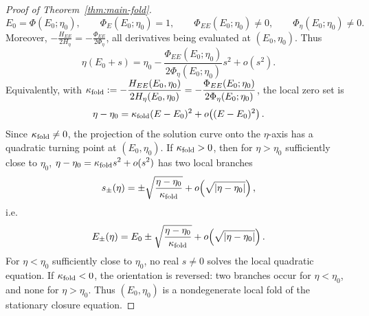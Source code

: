 \documentclass[pdflatex,sn-mathphys-num]{sn-jnl}
\theoremstyle{thmstyleone}
\theoremstyle{definition}
\theoremstyle{remark}
\newcommand{\abs}[1]{\left\lvert#1\right\rvert}
\numberwithin{equation}{section}
\begin{document}
\begin{proof}[Proof of Theorem~\ref{thm:main-fold}]
\[E_0=\Phi(E_0;\eta_0),
\qquad
\Phi_E(E_0;\eta_0)=1,
\qquad
\Phi_{EE}(E_0;\eta_0)\ne0,
\qquad
\Phi_\eta(E_0;\eta_0)\ne0.
\]
Moreover,
$\displaystyle 
-\frac{H_{EE}}{2H_\eta}
=
-\frac{\Phi_{EE}}{2\Phi_\eta}$,
all derivatives being evaluated at \((E_0,\eta_0)\). Thus
\[
\eta(E_0+s)
=
\eta_0
-
\frac{\Phi_{EE}(E_0;\eta_0)}
     {2\Phi_\eta(E_0;\eta_0)}
s^2
+
o(s^2).
\]
Equivalently, with
$\displaystyle 
\kappa_{\rm fold}
:=
-\frac{H_{EE}(E_0,\eta_0)}{2H_\eta(E_0,\eta_0)}
=
-\frac{\Phi_{EE}(E_0;\eta_0)}{2\Phi_\eta(E_0;\eta_0)}$,
the local zero set is
\[
\eta-\eta_0
=
\kappa_{\rm fold}(E-E_0)^2
+
o\!\left((E-E_0)^2\right).
\]
Since
$\displaystyle 
\kappa_{\rm fold}\ne0$,
the projection of the solution curve onto the \(\eta\)-axis has a quadratic
turning point at \((E_0,\eta_0)\).
If \(\kappa_{\rm fold}>0\), then for \(\eta>\eta_0\) sufficiently close to
\(\eta_0\),
$\displaystyle 
\eta-\eta_0
=
\kappa_{\rm fold}s^2+o(s^2)$
has two local branches
\[
s_\pm(\eta)
=
\pm
\sqrt{\frac{\eta-\eta_0}{\kappa_{\rm fold}}}
+
o\!\left(\sqrt{\abs{\eta-\eta_0}}\right),
\]
i.e.
\[
E_\pm(\eta)
=
E_0
\pm
\sqrt{\frac{\eta-\eta_0}{\kappa_{\rm fold}}}
+
o\!\left(\sqrt{\abs{\eta-\eta_0}}\right).
\]
For \(\eta<\eta_0\) sufficiently close to \(\eta_0\), no real \(s\ne0\) solves the
local quadratic equation. If \(\kappa_{\rm fold}<0\), the orientation is reversed:
two branches occur for \(\eta<\eta_0\), and none for \(\eta>\eta_0\).
Thus \((E_0,\eta_0)\) is a nondegenerate local fold of the stationary closure
equation.
\end{proof}
\end{document}
